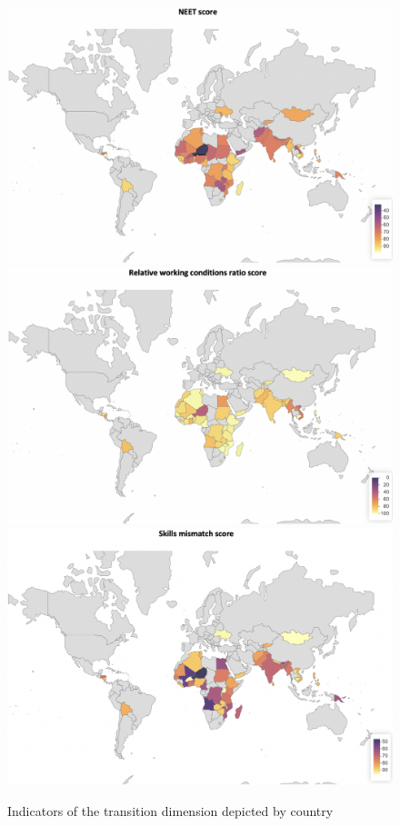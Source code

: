 \documentclass[
  a4paper, twoside, 12pt]{book}
\begin{document}
\begin{figure}[H]

{\centering \includegraphics[width=0.7\linewidth,]{figures/maps/NEET_total} \includegraphics[width=0.7\linewidth,]{figures/maps/wcratio_total} \includegraphics[width=0.7\linewidth,]{figures/maps/skillsmismatch_total} 

}

\caption{Indicators of the transition dimension depicted by country}\label{fig:fig-transitionmap}
\end{figure}
\end{document}
